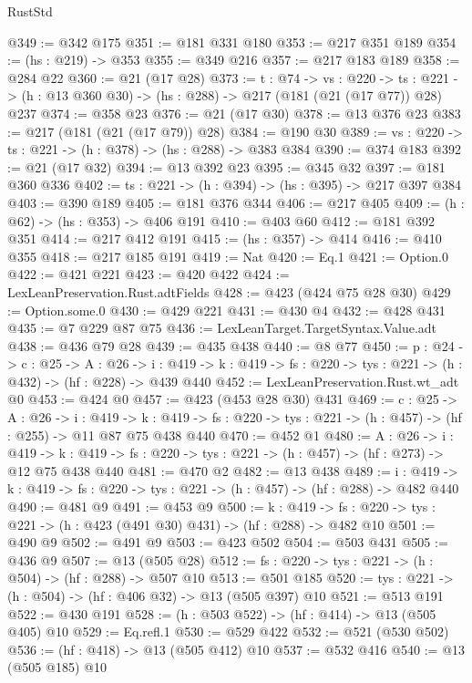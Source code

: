 \begin{lexlean}{RustStd}
\begin{coremodule}
@349 := @342 @175
@351 := @181 @331 @180
@353 := @217 @351 @189
@354 := (hs : @219) -> @353
@355 := @349 @216
@357 := @217 @183 @189
@358 := @284 @22
@360 := @21 (@17 @28)
@373 := {t : @74} ->
  {vs : @220} ->
  {ts : @221} -> (h : @13 @360 @30) -> (hs : @288) -> @217 (@181 (@21 (@17 @77)) @28) @237
@374 := @358 @23
@376 := @21 (@17 @30)
@378 := @13 @376 @23
@383 := @217 (@181 (@21 (@17 @79)) @28)
@384 := @190 @30
@389 := {vs : @220} -> {ts : @221} -> (h : @378) -> (hs : @288) -> @383 @384
@390 := @374 @183
@392 := @21 (@17 @32)
@394 := @13 @392 @23
@395 := @345 @32
@397 := @181 @360 @336
@402 := {ts : @221} -> (h : @394) -> (hs : @395) -> @217 @397 @384
@403 := @390 @189
@405 := @181 @376 @344
@406 := @217 @405
@409 := (h : @62) -> (hs : @353) -> @406 @191
@410 := @403 @60
@412 := @181 @392 @351
@414 := @217 @412 @191
@415 := (hs : @357) -> @414
@416 := @410 @355
@418 := @217 @185 @191
@419 := Nat
@420 := Eq.{1}
@421 := Option.{0}
@422 := @421 @221
@423 := @420 @422
@424 := LexLeanPreservation.Rust.adtFields
@428 := @423 (@424 @75 @28 @30)
@429 := Option.some.{0}
@430 := @429 @221
@431 := @430 @4
@432 := @428 @431
@435 := @7 @229 @87 @75
@436 := LexLeanTarget.TargetSyntax.Value.adt
@438 := @436 @79 @28
@439 := @435 @438
@440 := @8 @77
@450 := {p : @24} ->
  {c : @25} ->
  {A : @26} ->
  {i : @419} -> {k : @419} -> {fs : @220} -> {tys : @221} -> (h : @432) -> (hf : @228) -> @439 @440
@452 := LexLeanPreservation.Rust.wt_adt @0
@453 := @424 @0
@457 := @423 (@453 @28 @30) @431
@469 := {c : @25} ->
  {A : @26} ->
  {i : @419} ->
  {k : @419} -> {fs : @220} -> {tys : @221} -> (h : @457) -> (hf : @255) -> @11 @87 @75 @438 @440
@470 := @452 @1
@480 := {A : @26} ->
  {i : @419} ->
  {k : @419} -> {fs : @220} -> {tys : @221} -> (h : @457) -> (hf : @273) -> @12 @75 @438 @440
@481 := @470 @2
@482 := @13 @438
@489 := {i : @419} ->
  {k : @419} -> {fs : @220} -> {tys : @221} -> (h : @457) -> (hf : @288) -> @482 @440
@490 := @481 @9
@491 := @453 @9
@500 := {k : @419} ->
  {fs : @220} -> {tys : @221} -> (h : @423 (@491 @30) @431) -> (hf : @288) -> @482 @10
@501 := @490 @9
@502 := @491 @9
@503 := @423 @502
@504 := @503 @431
@505 := @436 @9
@507 := @13 (@505 @28)
@512 := {fs : @220} -> {tys : @221} -> (h : @504) -> (hf : @288) -> @507 @10
@513 := @501 @185
@520 := {tys : @221} -> (h : @504) -> (hf : @406 @32) -> @13 (@505 @397) @10
@521 := @513 @191
@522 := @430 @191
@528 := (h : @503 @522) -> (hf : @414) -> @13 (@505 @405) @10
@529 := Eq.refl.{1}
@530 := @529 @422
@532 := @521 (@530 @502)
@536 := (hf : @418) -> @13 (@505 @412) @10
@537 := @532 @416
@540 := @13 (@505 @185) @10

\end{coremodule}
\end{lexlean}

